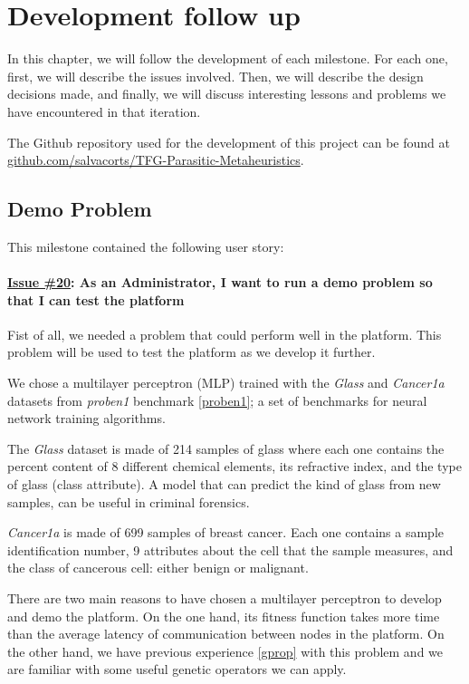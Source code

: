 \chapter{Development follow up}
In this chapter, we will follow the development of each milestone. For each one, first, we will describe the issues involved. Then, we will describe the design decisions made, and finally, we will discuss interesting lessons and problems we have encountered in that iteration.

The Github repository used for the development of this project can be found at \href{https://github.com/salvacorts/TFG-Parasitic-Metaheuristics}{github.com/salvacorts/TFG-Parasitic-Metaheuristics}.

\section{Demo Problem}
This milestone contained the following user story:

\subsubsection*{\href{https://github.com/salvacorts/TFG-Parasitic-Metaheuristics/issues/20}{Issue \#20}: As an Administrator, I want to run a demo problem so that I can test the platform} 

Fist of all, we needed a problem that could perform well in the platform. This problem will be used to test the platform as we develop it further.

We chose a multilayer perceptron (MLP) trained with the \textit{Glass} and \textit{Cancer1a} datasets from \textit{proben1} benchmark \ref{proben1}; a set of benchmarks for neural network training algorithms.

The \textit{Glass} dataset is made of 214 samples of glass where each one contains the percent content of 8 different chemical elements, its refractive index, and the type of glass (class attribute). A model that can predict the kind of glass from new samples, can be useful in criminal forensics.

\textit{Cancer1a} is made of 699 samples of breast cancer. Each one contains a sample identification number, 9 attributes about the cell that the sample measures, and the class of cancerous cell: either benign or malignant.

There are two main reasons to have chosen a multilayer perceptron to develop and demo the platform. On the one hand, its fitness function takes more time than the average latency of communication between nodes in the platform. On the other hand, we have previous experience \ref{gprop} with this problem and we are familiar with some useful genetic operators we can apply.

